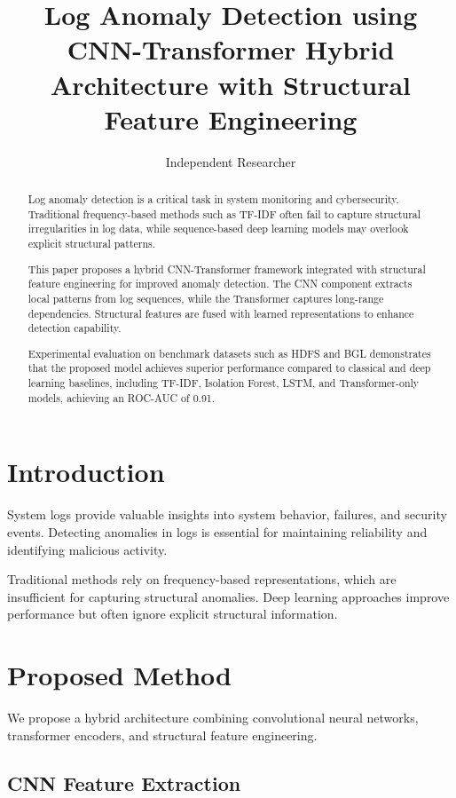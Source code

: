 \documentclass[11pt]{article}
\title{Log Anomaly Detection using CNN-Transformer Hybrid Architecture with Structural Feature Engineering}
\author{
Independent Researcher
}
\date{}
\begin{document}
\maketitle

\begin{abstract}
Log anomaly detection is a critical task in system monitoring and cybersecurity. Traditional frequency-based methods such as TF-IDF often fail to capture structural irregularities in log data, while sequence-based deep learning models may overlook explicit structural patterns.

This paper proposes a hybrid CNN-Transformer framework integrated with structural feature engineering for improved anomaly detection. The CNN component extracts local patterns from log sequences, while the Transformer captures long-range dependencies. Structural features are fused with learned representations to enhance detection capability.

Experimental evaluation on benchmark datasets such as HDFS and BGL demonstrates that the proposed model achieves superior performance compared to classical and deep learning baselines, including TF-IDF, Isolation Forest, LSTM, and Transformer-only models, achieving an ROC-AUC of 0.91.
\end{abstract}

\section{Introduction}

System logs provide valuable insights into system behavior, failures, and security events. Detecting anomalies in logs is essential for maintaining reliability and identifying malicious activity.

Traditional methods rely on frequency-based representations, which are insufficient for capturing structural anomalies. Deep learning approaches improve performance but often ignore explicit structural information.

\section{Proposed Method}

We propose a hybrid architecture combining convolutional neural networks, transformer encoders, and structural feature engineering.

\subsection{CNN Feature Extraction}
\end{document}

